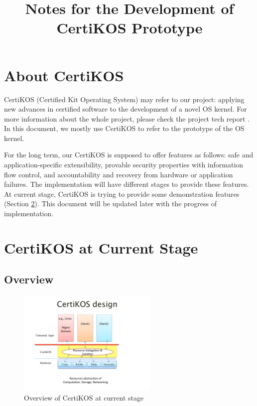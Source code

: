 \documentclass[a4paper,12pt]{article}
\begin{document}
\title{ Notes for the Development of CertiKOS Prototype }
\maketitle

\tableofcontents

\newpage
\section{About CertiKOS }

CertiKOS (Certified Kit Operating System) may refer to our project: applying new advances
in certified software \cite{certifiedsoftware} to the development of a novel OS kernel. For more information about the whole project, please check  the project tech report \cite{CertiKOSReport}. In this document, we mostly use CertiKOS to refer to the prototype of the OS kernel.

For the long term,  our CertiKOS is supposed to offer features as follows: safe and application-specific extensibility, provable security properties with information flow control, and accountability and recovery from hardware or application failures. The implementation will have different stages to provide these features. At current stage, CertiKOS is trying to provide some demonstration features (Section \ref{sec:currentstage}). This document will be updated later with the progress of implementation.


\section{CertiKOS at Current Stage}
\label{sec:currentstage}


\subsection{Overview}
\begin{figure}[!ht]
 \centerline{
 \includegraphics[width=0.6\textwidth]{overview.pdf}}
 \caption{Overview of CertiKOS at current stage} \label{fig:overview}
\end{figure}
\end{document}
